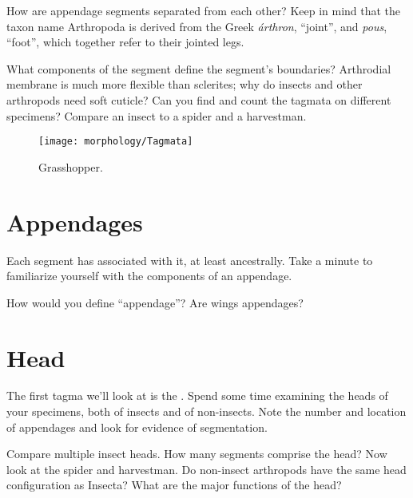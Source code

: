 \begin{theo}[traits2]
{}How are appendage segments separated from each other? Keep in mind that the taxon name Arthropoda is derived from the Greek \textit{árthron}, ``joint'', and \textit{pous}, ``foot'', which together refer to their jointed legs.\vspace{3mm}

\noindent{}What components of the segment define the segment's boundaries? Arthrodial membrane is much more flexible than sclerites; why do insects and other arthropods need soft cuticle? Can you find and count the tagmata on different specimens? Compare an insect to a spider and a harvestman.
\end{theo}

\begin{figure}[ht!]
  \centering
    \texttt{[image: morphology/Tagmata]}
  \caption{Grasshopper. \citep[redrawn from ][Fig. 63]{bhl128276}}
  \label{fig:tagmata}
\end{figure}

\section{Appendages}
Each segment has  associated with it, at least ancestrally. Take a minute to familiarize yourself with the components of an appendage. \vspace{3mm}

\begin{theo}[appendage]
{}How would you define ``appendage''? Are wings appendages?
\end{theo}

\section{Head}
The first tagma we'll look at is the . Spend some time examining the heads of your specimens, both of insects and of non-insects. Note the number and location of appendages and look for evidence of segmentation. \vspace{3mm}

\begin{theo}[traits3]
{}Compare multiple insect heads. How many segments comprise the head? Now look at the spider and harvestman. Do non-insect arthropods have the same head configuration as Insecta? What are the major functions of the head?
\end{theo}

